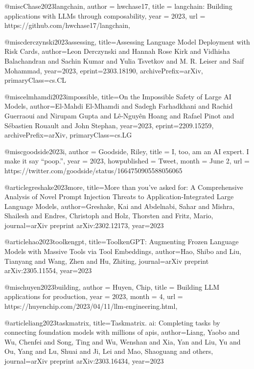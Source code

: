 @misc{Chase2023langchain,
  author = {hwchase17},
  title = {langchain: Building applications with LLMs through composability},
  year = {2023},
  url = {https://github.com/hwchase17/langchain},
}

@misc{derczynski2023assessing,
      title={Assessing Language Model Deployment with Risk Cards},
      author={Leon Derczynski and Hannah Rose Kirk and Vidhisha Balachandran and Sachin Kumar and Yulia Tsvetkov and M. R. Leiser and Saif Mohammad},
      year={2023},
      eprint={2303.18190},
      archivePrefix={arXiv},
      primaryClass={cs.CL}
}

@misc{elmhamdi2023impossible,
      title={On the Impossible Safety of Large AI Models},
      author={El-Mahdi El-Mhamdi and Sadegh Farhadkhani and Rachid Guerraoui and Nirupam Gupta and Lê-Nguyên Hoang and Rafael Pinot and Sébastien Rouault and John Stephan},
      year={2023},
      eprint={2209.15259},
      archivePrefix={arXiv},
      primaryClass={cs.LG}
}

@misc{goodside2023i,
  author = {Goodside, Riley},
  title = {I, too, am an AI expert. I make it say “poop.”},
  year = {2023},
  howpublished = {Tweet},
  month = {June 2},
  url = {https://twitter.com/goodside/status/1664750905588056065}
}

@article{greshake2023more,
  title={More than you've asked for: A Comprehensive Analysis of Novel Prompt Injection Threats to Application-Integrated Large Language Models},
  author={Greshake, Kai and Abdelnabi, Sahar and Mishra, Shailesh and Endres, Christoph and Holz, Thorsten and Fritz, Mario},
  journal={arXiv preprint arXiv:2302.12173},
  year={2023}
}

@article{hao2023toolkengpt,
  title={ToolkenGPT: Augmenting Frozen Language Models with Massive Tools via Tool Embeddings},
  author={Hao, Shibo and Liu, Tianyang and Wang, Zhen and Hu, Zhiting},
  journal={arXiv preprint arXiv:2305.11554},
  year={2023}
}

@misc{huyen2023building,
  author = {Huyen, Chip},
  title = {Building LLM applications for production},
  year = {2023},
  month = {4},
  url = {https://huyenchip.com/2023/04/11/llm-engineering.html},
}

@article{liang2023taskmatrix,
  title={Taskmatrix. ai: Completing tasks by connecting foundation models with millions of apis},
  author={Liang, Yaobo and Wu, Chenfei and Song, Ting and Wu, Wenshan and Xia, Yan and Liu, Yu and Ou, Yang and Lu, Shuai and Ji, Lei and Mao, Shaoguang and others},
  journal={arXiv preprint arXiv:2303.16434},
  year={2023}
}

